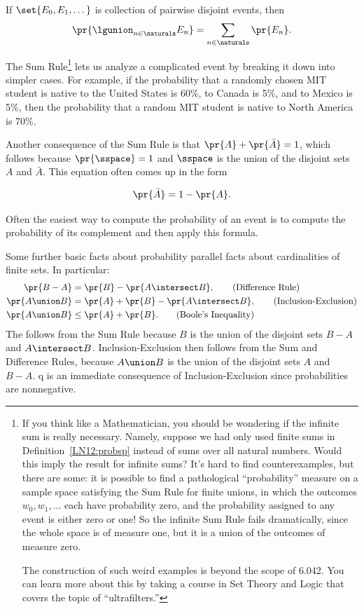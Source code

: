 \begin{rul*}  
  If $\set{E_0,E_1,\dots}$ is collection of pairwise disjoint events, then
\[
\pr{\lgunion_{n\in\naturals}E_n} = \sum_{n\in\naturals} \pr{E_n}.
\]
\end{rul*}

The Sum Rule\footnote{If you think like a Mathematician, you should be
   wondering if the infinite sum is really necessary.  Namely, suppose we
   had only used finite sums in Definition~\ref{LN12:probsp} instead of sums
   over all natural numbers.  Would this imply the result for infinite
   sums?  It's hard to find counterexamples, but there are some: it is
   possible to find a pathological ``probability'' measure on a sample
   space satisfying the Sum Rule for finite unions, in which the outcomes
   $w_0,w_1,\dots$ each have probability zero, and the probability
   assigned to any event is either zero or one!  So the infinite Sum Rule
   fails dramatically, since the whole space is of measure one, but it is
   a union of the outcomes of measure zero.

   The construction of such weird examples is beyond the scope of 6.042.  You
   can learn more about this by taking a course in Set Theory and Logic that
   covers the topic of ``ultrafilters.''}
lets us analyze a complicated event by breaking it down into simpler
cases.  For example, if the probability that a randomly chosen MIT student
is native to the United States is 60\%, to Canada is 5\%, and to Mexico is
5\%, then the probability that a random MIT student is native to North
America is 70\%.

Another consequence of the Sum Rule is that $\pr{A} + \pr{\bar{A}} = 1$,
which follows because $\pr{\sspace}=1$ and $\sspace$ is the union of the
disjoint sets $A$ and $\bar{A}$.  This equation often comes up in the form
\begin{rul*} 
\[
\pr{\bar{A}}  =  1 - \pr{A}.
\]
\end{rul*}
Often the easiest way to compute the probability of an event is to compute
the probability of its complement and then apply this formula.

Some further basic facts about probability parallel facts about
cardinalities of finite sets.  In particular:
\begin{align}
\pr{B-A}        & =  \pr{B} - \pr{A \intersect B},\tag{Difference Rule}\\
\pr{A \union B} & =  \pr{A} + \pr{B} - \pr{A \intersect B},
                  \tag{Inclusion-Exclusion}\\
\pr{A \union B} & \le  \pr{A} + \pr{B}. \tag{Boole's Inequality}
\end{align}
The  follows from the Sum Rule because $B$ is the
union of the disjoint sets $B-A$ and $A \intersect B$.
 Inclusion-Exclusion then
follows from the Sum and Difference Rules, because $A \union B$ is the
union of the disjoint sets $A$ and $B-A$.  q is an
immediate consequence of Inclusion-Exclusion since probabilities are
nonnegative.

